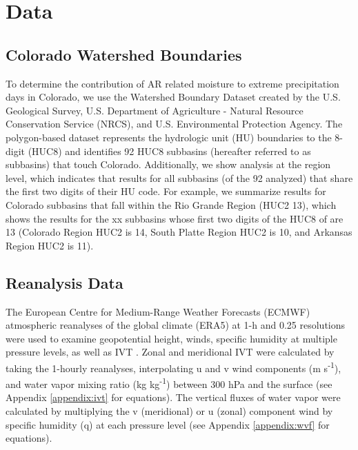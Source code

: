 \documentclass[draft]{agujournal2019}
\begin{document}




\section{Data}
\label{sec:data}
\subsection{Colorado Watershed Boundaries}
To determine the contribution of AR related moisture to extreme precipitation days in Colorado, we use the Watershed Boundary Dataset created by the U.S. Geological Survey, U.S. Department of Agriculture - Natural Resource Conservation Service (NRCS), and U.S. Environmental Protection Agency. The polygon-based dataset represents the hydrologic unit (HU) boundaries to the 8-digit (HUC8) and identifies 92 HUC8 subbasins (hereafter referred to as subbasins) that touch Colorado. Additionally, we show analysis at the region level, which indicates that results for all subbasins (of the 92 analyzed) that share the first two digits of their HU code. For example, we summarize results for Colorado subbasins that fall within the Rio Grande Region (HUC2 13), which shows the results for the xx subbasins whose first two digits of the HUC8 of are 13 (Colorado Region HUC2 is 14, South Platte Region HUC2 is 10, and Arkansas Region HUC2 is 11).

\subsection{Reanalysis Data}

The European Centre for Medium-Range Weather Forecasts (ECMWF) atmospheric reanalyses of the global climate (ERA5) at 1-h and  0.25\textdegree{} resolutions were used to examine geopotential height, winds, specific humidity at multiple pressure levels, as well as IVT \cite{Hersbach2020}. Zonal and meridional IVT were calculated by taking the 1-hourly reanalyses, interpolating u and v wind components (m s\textsuperscript{-1}), and water vapor mixing ratio (kg kg\textsuperscript{-1}) between 300 hPa and the surface (see Appendix \ref{appendix:ivt} for equations). The vertical fluxes of water vapor were calculated by multiplying the v (meridional) or u (zonal) component wind by specific humidity (q) at each pressure level (see Appendix \ref{appendix:wvf} for equations).
\end{document}
